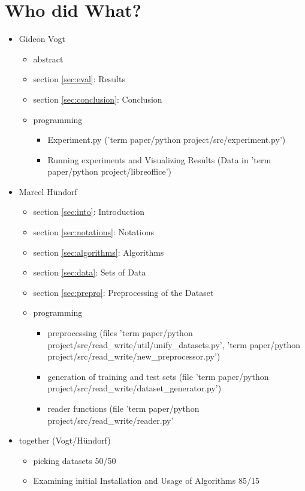 \documentclass[a4paper,preprint]{sig-alternate-xt}
\begin{document}
\section{Who did What?}
\begin{itemize}
    \item Gideon Vogt
    \begin{itemize}
        \item abstract
        \item section \ref{sec:eval}: Results
        \item section \ref{sec:conclusion}: Conclusion
        \item programming
            \begin{itemize}
                \item Experiment.py ('term paper/python project/src/experiment.py')
                \item Running experiments and Visualizing Results (Data in 'term paper/python project/libreoffice')
            \end{itemize}
    \end{itemize}
    \item Marcel Hündorf
    \begin{itemize}
        \item section \ref{sec:into}: Introduction
        \item section \ref{sec:notations}: Notations
        \item section \ref{sec:algorithms}: Algorithms
        \item section \ref{sec:data}: Sets of Data
        \item section \ref{sec:prepro}: Preprocessing of the Dataset
        \item programming
        \begin{itemize}
            \item preprocessing (files 'term paper/python project/src/read\_write/util/unify\_datasets.py', 'term paper/python project/src/read\_write/new\_preprocessor.py')
            \item generation of training and test sets (file 'term paper/python project/src/read\_write/dataset\_generator.py')
            \item reader functions (file 'term paper/python project/src/read\_write/reader.py'
        \end{itemize}
    \end{itemize}
    \item together (Vogt/Hündorf)
    \begin{itemize}
        \item picking datasets 50/50
        \item Examining initial Installation and Usage of Algorithms 85/15
    \end{itemize}
\end{itemize}
\end{document}
